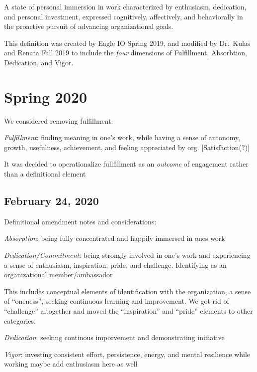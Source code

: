 \documentclass[
]{book}
\begin{document}
A state of personal immersion in work characterized by enthusiasm, dedication, and personal investment, expressed cognitively, affectively, and behaviorally in the proactive pursuit of advancing organizational goals.

This definition was created by Eagle IO Spring 2019, and modified by Dr.~Kulas and Renata Fall 2019 to include the \emph{four} dimensions of Fulfillment, Absorbtion, Dedication, and Vigor.

\hypertarget{spring-2020}{%
\section{Spring 2020}\label{spring-2020}}

We considered removing fulfillment.

\emph{Fulfillment}: finding meaning in one's work, while having a sense of autonomy, growth, usefulness, achievement, and feeling appreciated by org. {[}Satisfaction(?){]}

It was decided to operationalize fullfillment as an \emph{outcome} of engagement rather than a definitional element

\hypertarget{february-24-2020}{%
\subsection{February 24, 2020}\label{february-24-2020}}

Definitional amendment notes and considerations:

\emph{Absorption}: being fully concentrated and happily immersed in ones work \citep[time passes quickly and has difficulty detaching from ones work;][]{schaufeli_measurement_2002}

\emph{Dedication/Commitment}: being strongly involved in one's work and experiencing a sense of enthusiasm, inspiration, pride, and challenge. \citep{schaufeli_measurement_2002} Identifying as an organizational member/ambassador

This includes conceptual elements of identification with the organization, a sense of ``oneness'', seeking continuous learning and improvement. We got rid of ``challenge'' altogether and moved the ``inspiration'' and ``pride'' elements to other categories.

\emph{Dedication}: seeking continous imporvement and demonstrating initiative

\emph{Vigor}: investing consistent effort, persistence, energy, and mental resilience while working \citep{schaufeli_measurement_2002}
maybe add enthusiasm here as well
\end{document}

